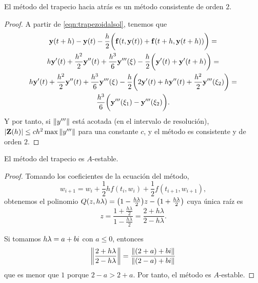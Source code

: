 \begin{proposition}
    El método del trapecio hacia atrás es un método consistente de orden $2$.
\end{proposition}

\begin{proof}
    A partir de \eqref{eqn:trapezoidalsol}, tenemos que 
    \begin{multline*}
        \vb{y}{}(t+h) - \vb{y}{}(t) - \frac{h}{2}\qty\bigg(
            \vb{f}{}(t, \vb{y}{}(t)) + \vb{f}{}(t+h, \vb{y}{}(t+h))
        ) = \\
        h\vb{y}{}'(t) + \frac{h^2}{2}\vb{y}{}''(t) + \frac{h^3}{6}\vb{y}{}'''(\xi)
            - \frac{h}{2}\qty\bigg(\vb{y}{}'(t) + \vb{y}{}'(t+h)) = \\
        h\vb{y}{}'(t) + \frac{h^2}{2}\vb{y}{}''(t) + \frac{h^3}{6}\vb{y}{}'''(\xi)
            - \frac{h}{2}\qty\bigg(2\vb{y}{}'(t) + h\vb{y}{}''(t)
            + \frac{h^2}{2}\vb{y}{}'''(\xi_2)) = \\
        \frac{h^3}{6}\qty\bigg(\vb{y}{}'''(\xi_1) - \vb{y}{}'''(\xi_2)).
    \end{multline*}
    Y por tanto, si $\norm{y'''}$ está acotada (en el intervalo de resolución),
    $\abs{\vb{Z}{}(h)} \le ch^2\max{\norm{y'''}}$
    para una constante $c$,
    y el método es consistente y de orden $2$.
\end{proof}

\begin{proposition}
    El método del trapecio es $A$-estable.
\end{proposition}

\begin{proof}
    Tomando los coeficientes de la ecuación del método,
    \begin{equation*}
        w_{i+1} = w_i + \frac{1}{2}hf(t_i, w_i) + \frac{1}{2}f(t_{i+1}, w_{i+1}),
    \end{equation*}
    obtenemos el polinomio
    $Q(z, h\lambda) = \qty(1 - \frac{h\lambda}{2})z - \qty(1+\frac{h\lambda}{2})$
    cuya única raíz es
    \begin{equation*}
        z = \frac{1 + \frac{h\lambda}{2}}{1 - \frac{h\lambda}{2}} =
        \frac{2 + h\lambda}{2 - h\lambda}.
    \end{equation*}

    Si tomamos $h\lambda = a + bi$ con $a \le 0$, entonces
    \begin{equation*}
        \norm{\frac{2 + h\lambda}{2 - h\lambda}} =
        \frac{\norm{(2+a) + bi}}{\norm{(2-a) + bi}}
    \end{equation*}
    que es menor que $1$ porque $2 - a > 2 + a$.
    Por tanto, el método es $A$-estable.
\end{proof}


